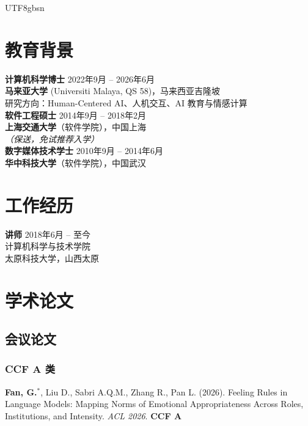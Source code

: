 \documentclass[a4paper,10pt]{article}
\newcommand{\pubitem}[1]{\item #1}
\begin{document}
\begin{CJK*}{UTF8}{gbsn}
\section*{教育背景}

\noindent
\textbf{计算机科学博士} \hfill 2022年9月 -- 2026年6月\\
\textbf{马来亚大学} (Universiti Malaya, QS 58)，马来西亚吉隆坡 \\
研究方向：Human-Centered AI、人机交互、AI 教育与情感计算 \\

\noindent
\textbf{软件工程硕士} \hfill 2014年9月 -- 2018年2月 \\
\textbf{上海交通大学}（软件学院），中国上海 \\
\textit{（保送，免试推荐入学）} \\

\noindent
\textbf{数字媒体技术学士} \hfill 2010年9月 -- 2014年6月 \\
\textbf{华中科技大学}（软件学院），中国武汉

\section*{工作经历}

\noindent
\textbf{讲师} \hfill 2018年6月 -- 至今 \\
计算机科学与技术学院 \\
太原科技大学，山西太原

\section*{学术论文\footnotemark[1]}

\subsection*{会议论文}

\subsubsection*{CCF A 类}

\begin{enumerate}[label={[C\arabic*]}]
    \pubitem{\textbf{Fan, G.}$^*$, Liu D., Sabri A.Q.M., Zhang R., Pan L. (2026). Feeling Rules in Language Models: Mapping Norms of Emotional Appropriateness Across Roles, Institutions, and Intensity. \textit{ACL 2026}. \textbf{CCF A}}


\end{enumerate}
\end{CJK*}
\end{document}

